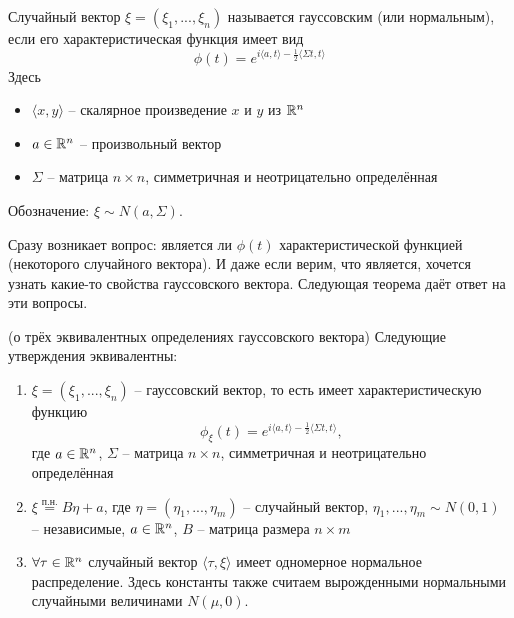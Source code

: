 \begin{definition}
    Случайный вектор $\xi = (\xi_1, ..., \xi_n)$ называется гауссовским (или нормальным), если его характеристическая функция имеет вид
    \[
        \phi(t) = e^{i \langle a, t \rangle - \frac{1}{2} \langle \Sigma t, t \rangle}
    \]
    Здесь
    \begin{itemize}
        \item $\langle x, y \rangle$ -- скалярное произведение $x$ и $y$ из $\mathbb{R}^n$
        \item $a \in \mathbb{R}^n$ -- произвольный вектор
        \item $\Sigma$ -- матрица $n \times n$, симметричная и неотрицательно определённая
    \end{itemize}
    Обозначение: $\xi \sim N(a, \Sigma)$.
\end{definition}

\begin{note}
    Сразу возникает вопрос: является ли $\phi(t)$ характеристической функцией (некоторого случайного вектора). И даже если верим, что является, хочется узнать какие-то свойства гауссовского вектора. Следующая теорема даёт ответ на эти вопросы.
\end{note}

\begin{theorem} (о трёх эквивалентных определениях гауссовского вектора)
    Следующие утверждения эквивалентны:
    \begin{enumerate}
        \item $\xi = (\xi_1, ..., \xi_n)$ -- гауссовский вектор, то есть имеет характеристическую функцию
        \[
            \phi_\xi(t) = e^{i \langle a, t \rangle - \frac{1}{2} \langle \Sigma t, t \rangle},
        \]
        где $a \in \mathbb{R}^n$, $\Sigma$ -- матрица $n \times n$, симметричная и неотрицательно определённая

        \item $\xi \stackrel{\text{п.н.}}{=} B\eta + a$, где $\eta = (\eta_1, ..., \eta_m)$ -- случайный вектор, $\eta_1, ..., \eta_m \sim N(0, 1)$ -- независимые, $a \in \mathbb{R}^n$, $B$ -- матрица размера $n \times m$

        \item $\forall \tau \in \mathbb{R}^n$ случайный вектор $\langle \tau, \xi \rangle$ имеет одномерное нормальное распределение. Здесь константы также считаем вырожденными нормальными случайными величинами $N(\mu, 0)$.
    \end{enumerate}
\end{theorem}

